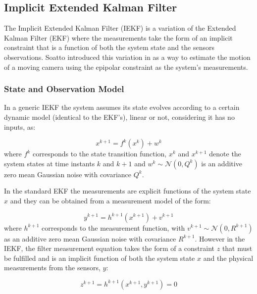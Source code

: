 \subsection{Implicit Extended Kalman Filter}

The Implicit Extended Kalman Filter (IEKF) is a variation of the Extended Kalman Filter (EKF) \cite{Ribeiro04} where the measurements take the form of an implicit constraint that is a function of both the system state and the sensors observations. Soatto introduced this variation in \cite{Soatto96,Soatto96b} as a way to estimate the motion of a moving camera using the epipolar constraint \cite{Hartley04} as the system's measurements.

\subsubsection{State and Observation Model}

In a generic IEKF the system assumes its state evolves according to a certain dynamic model (identical to the EKF's), linear or not, considering it has no inputs, as:

\begin{equation}
x^{k+1}=f^{k}\left(x^{k}\right)+w^k
\label{eq:iekf_generic_prediction}
\end{equation}
where $f^k$ corresponds to the state transition function, $x^{k}$ and $x^{k+1}$ denote the system states at time instants $k$ and $k+1$ and $w^{k}\sim \mathcal{N}\left(0,Q^{k}\right)$ is an additive zero mean Gaussian noise with covariance $Q^{k}$.

In the standard EKF the measurements are explicit functions of the system state $x$ and they can be obtained from a measurement model of the form:

\begin{equation}
y^{k+1} = h^{k+1}\left(x^{k+1}\right) + v^{k+1}
\label{eq:iekf_generic_measurement_y}
\end{equation}
where $h^{k+1}$ corresponds to the measurement function, with $v^{k+1}\sim \mathcal{N}\left(0,R^{k+1}\right)$ as an additive zero mean Gaussian noise with covariance $R^{k+1}$. However in the IEKF, the filter measurement equation takes the form of a constraint $z$ that must be fulfilled and is an implicit function of both the system state $x$ and the physical measurements from the sensors, $y$:

\begin{equation}
z^{k+1} = h^{k+1}\left(x^{k+1}, y^{k+1}\right) = 0
\label{eq:iekf_generic_constraint}
\end{equation}

